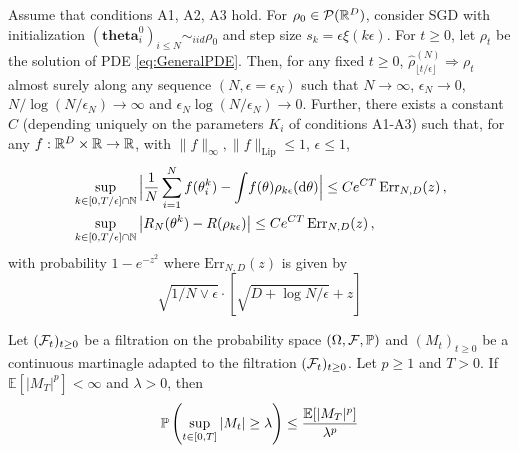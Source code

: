 \documentclass{article}
\begin{document}
\begin{theorem}[PM. Nguyen et al. (2018)]\label{thm: mean field nguyen}
Assume that conditions {\sf A1}, {\sf A2}, {\sf A3} hold.
For $\rho_0\in\mathcal{P}(\mathbb{R}^D)$, consider SGD with initialization $(\mathbf{theta}^0_i)_{i\leq N}\sim_{iid}\rho_0$ and step size $s_k = \epsilon \xi(k \epsilon)$. For $t\geq 0$, let $\rho_t$ be the solution of PDE \eqref{eq:GeneralPDE}.
Then, for any fixed $t \geq 0$,  $\hat{\rho}^{(N)}_{\lfloor t / \epsilon \rfloor} \Rightarrow \rho_{t}$ almost surely along any sequence $(N,\epsilon = \epsilon_N)$ such that $N \to \infty$, $\epsilon_N \to 0$, $N/\log (N/\epsilon_N) \to\infty$ and $\epsilon_N \log(N / \epsilon_N)\to 0$.
Further, there exists a constant $C$  (depending uniquely on the parameters $K_i$ of conditions {\sf A1}-{\sf A3}) such that,
for any $f:\mathbb{R}^D\times \mathbb{R}\to\mathbb{R}$, with $\|f\|_{\infty}, \|f\|_{\text{Lip}}\leq 1$, $\epsilon\leq 1$,
%
\begin{align}
%
&\sup_{k \in  [0, T/\epsilon] \cap \N}\Big|\frac{1}{N}\sum_{i=1}^Nf(\mathbf{\theta}^{k}_i)- \int\!
  f(\mathbf{\theta})  \rho_{k\epsilon}(\diff \mathbf{\theta}) \Big| \leq Ce^{CT}\,\text{Err}_{N,D}(z)\, ,\nonumber\\
&\sup_{k \in  [0, T/\epsilon] \cap \N}\big|R_{N}(\mathbf{\theta}^{k})-R(\rho_{k\epsilon})\big| \leq Ce^{CT}\,\text{Err}_{N,D}(z)\, ,
%
\end{align} 
%
with probability $1- e^{-z^2}$ where $\text{Err}_{N,D}(z)$ is given by
\begin{equation}
	\sqrt{1/N\lor \epsilon}\cdot \left[ \sqrt{D + \log N/\epsilon}+z \right]
\end{equation}

\end{theorem}


\begin{theorem}\label{thm: Doob}
	Let $ (\mathcal{F}_{t})_{t\geq 0}$ be a filtration on the probability space $ (\Omega, \mathcal{F}, \mathbb{P})$ and $ (M_{t})_{t\geq 0}$ be a continuous martinagle adapted to the filtration $ (\mathcal{F}_{t})_{t\geq 0}$. Let $ p\geq 1$ and $ T>0$. If $\mathbb{E}[|M_{T}|^{p}]<\infty$ and $ \lambda > 0$, then 
	\begin{equation}
		\mathbb{P}\left(\displaystyle\sup_{t\in [0,T]}|M_{t}|\geq \lambda\right)\leq \frac{\mathbb{E}[|M_{T}|^{p}]}{\lambda^{p}}
	\end{equation}
	
\end{theorem}
\end{document}
